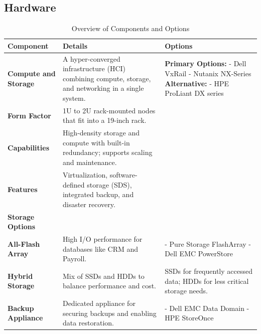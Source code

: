 \documentclass{llncs}
\begin{document}
\subsection{Hardware}
\vspace{-40pt}
\begin{table}[H]
  \setlength{\tabcolsep}{5pt} %
  \renewcommand{\arraystretch}{1.2} %
  \centering
  \begin{tabular}{|p{3cm}|p{8cm}|p{4cm}|}
  \hline
  \textbf{Component} & \textbf{Details} & \textbf{Options} \\
  \hline
  \textbf{Compute and Storage} & 
  A hyper-converged infrastructure (HCI) combining compute, storage, and networking in a single system. & 
  \textbf{Primary Options:} \newline 
  - Dell VxRail \newline 
  - Nutanix NX-Series \newline 
  \textbf{Alternative:} \newline 
  - HPE ProLiant DX series \\
  \hline
  \textbf{Form Factor} & 
  1U to 2U rack-mounted nodes that fit into a 19-inch rack. & 
  \\
  \hline
  \textbf{Capabilities} & 
  High-density storage and compute with built-in redundancy; supports scaling and maintenance. & 
  \\
  \hline
  \textbf{Features} & 
  Virtualization, software-defined storage (SDS), integrated backup, and disaster recovery. & 
  \\
  \hline
  \textbf{Storage Options} & 
  & 
  \\
  \hline
  \textbf{All-Flash Array} & 
  High I/O performance for databases like CRM and Payroll. & 
  - Pure Storage FlashArray \newline 
  - Dell EMC PowerStore \\
  \hline
  \textbf{Hybrid Storage} & 
  Mix of SSDs and HDDs to balance performance and cost. & 
  SSDs for frequently accessed data; HDDs for less critical storage needs. \\
  \hline
  \textbf{Backup Appliance} & 
  Dedicated appliance for securing backups and enabling data restoration. & 
  - Dell EMC Data Domain \newline 
  - HPE StoreOnce \\
  \hline
  \end{tabular}
  \caption{Overview of Components and Options}
  \label{tab:components}
  \end{table}  
\end{document}
